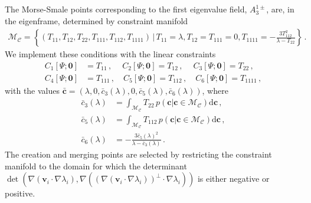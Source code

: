 \documentclass[a4paper, 11pt]{article}
\begin{document}
%

The Morse-Smale points corresponding to the first eigenvalue field, $A_3^{1\pm}$, are, in the eigenframe, determined by constraint manifold
\begin{align}
\mathcal{M}_{\mathcal{C}} = \left\{(T_{11},T_{12},T_{22},T_{111},T_{112},T_{1111}) \,|\, T_{11}=\lambda, T_{12}=T_{111}=0,T_{1111}=-\frac{3T_{112}^2}{\lambda-T_{22}}\right\}\,.
\end{align}
We implement these conditions with the linear constraints
\begin{align}
C_1[\Psi;\bm{0}]&=T_{11}\,,\ \quad
C_2[\Psi;\bm{0}]=T_{12}\,,\ \quad
C_3[\Psi;\bm{0}]=T_{22}\,, \\
C_4[\Psi;\bm{0}]&=T_{111}\,,\quad
C_5[\Psi;\bm{0}]=T_{112}\,,\quad
C_6[\Psi;\bm{0}]=T_{1111}\,,
\end{align}
with the values $\bar{\bm{c}}=(\lambda, 0, \bar{c}_3(\lambda), 0, \bar{c}_5(\lambda),\bar{c}_6(\lambda))$, where
\begin{align}
\bar{c}_3(\lambda) &= \int_{\mathcal{M}_\mathcal{C}} T_{22}\,p(\bm{c}|\bm{c}\in \mathcal{M}_\mathcal{C})\mathrm{d}\bm{c}\,,\\
\bar{c}_5(\lambda) &= \int_{\mathcal{M}_\mathcal{C}} T_{112}\,p(\bm{c}|\bm{c}\in \mathcal{M}_\mathcal{C})\mathrm{d}\bm{c}\,,\\
\bar{c}_6(\lambda) &=-\frac{3\bar{c}_5(\lambda)^2}{\lambda-\bar{c}_3(\lambda)}\,.
\end{align}
The creation and merging points are selected by restricting the constraint manifold to the domain for which the determinant 
$\det\left(\nabla (\bm{v}_i \cdot \nabla \lambda_i), \nabla ((\nabla (\bm{v}_i \cdot \nabla \lambda_i))^\perp \cdot \nabla \lambda_i)\right)$ is either negative or positive.
\end{document}
